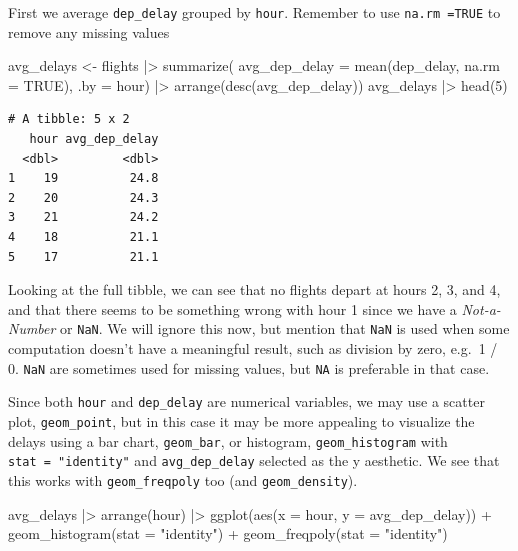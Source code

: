 \documentclass[
  letterpaper,
  DIV=11,
  numbers=noendperiod]{scrreprt}
\newenvironment{Shaded}{\begin{snugshade}}{\end{snugshade}}
\newcommand{\AttributeTok}[1]{\textcolor[rgb]{0.40,0.45,0.13}{#1}}
\newcommand{\ConstantTok}[1]{\textcolor[rgb]{0.56,0.35,0.01}{#1}}
\newcommand{\DecValTok}[1]{\textcolor[rgb]{0.68,0.00,0.00}{#1}}
\newcommand{\FunctionTok}[1]{\textcolor[rgb]{0.28,0.35,0.67}{#1}}
\newcommand{\NormalTok}[1]{\textcolor[rgb]{0.00,0.23,0.31}{#1}}
\newcommand{\OtherTok}[1]{\textcolor[rgb]{0.00,0.23,0.31}{#1}}
\newcommand{\SpecialCharTok}[1]{\textcolor[rgb]{0.37,0.37,0.37}{#1}}
\newcommand{\StringTok}[1]{\textcolor[rgb]{0.13,0.47,0.30}{#1}}
\begin{document}
First we average \texttt{dep\_delay} grouped by \texttt{hour}. Remember
to use \texttt{na.rm\ =TRUE} to remove any missing values

\begin{Shaded}
\begin{Highlighting}[]
\NormalTok{avg\_delays }\OtherTok{\textless{}{-}}\NormalTok{ flights }\SpecialCharTok{|\textgreater{}}
  \FunctionTok{summarize}\NormalTok{(}
    \AttributeTok{avg\_dep\_delay =} \FunctionTok{mean}\NormalTok{(dep\_delay, }\AttributeTok{na.rm =} \ConstantTok{TRUE}\NormalTok{), }
    \AttributeTok{.by =}\NormalTok{ hour) }\SpecialCharTok{|\textgreater{}}
  \FunctionTok{arrange}\NormalTok{(}\FunctionTok{desc}\NormalTok{(avg\_dep\_delay))}
\NormalTok{avg\_delays }\SpecialCharTok{|\textgreater{}} \FunctionTok{head}\NormalTok{(}\DecValTok{5}\NormalTok{)}
\end{Highlighting}
\end{Shaded}

\begin{verbatim}
# A tibble: 5 x 2
   hour avg_dep_delay
  <dbl>         <dbl>
1    19          24.8
2    20          24.3
3    21          24.2
4    18          21.1
5    17          21.1
\end{verbatim}

Looking at the full tibble, we can see that no flights depart at hours
2, 3, and 4, and that there seems to be something wrong with hour 1
since we have a \emph{Not-a-Number} or \texttt{NaN}. We will ignore this
now, but mention that \texttt{NaN} is used when some computation doesn't
have a meaningful result, such as division by zero, e.g.~1 / 0.
\texttt{NaN} are sometimes used for missing values, but \texttt{NA} is
preferable in that case.

Since both \texttt{hour} and \texttt{dep\_delay} are numerical
variables, we may use a scatter plot, \texttt{geom\_point}, but in this
case it may be more appealing to visualize the delays using a bar chart,
\texttt{geom\_bar}, or histogram, \texttt{geom\_histogram} with
\texttt{stat\ =\ "identity"} and \texttt{avg\_dep\_delay} selected as
the y aesthetic. We see that this works with \texttt{geom\_freqpoly} too
(and \texttt{geom\_density}).

\begin{Shaded}
\begin{Highlighting}[]
\NormalTok{avg\_delays }\SpecialCharTok{|\textgreater{}}
  \FunctionTok{arrange}\NormalTok{(hour) }\SpecialCharTok{|\textgreater{}}
  \FunctionTok{ggplot}\NormalTok{(}\FunctionTok{aes}\NormalTok{(}\AttributeTok{x =}\NormalTok{ hour, }\AttributeTok{y =}\NormalTok{ avg\_dep\_delay)) }\SpecialCharTok{+} 
  \FunctionTok{geom\_histogram}\NormalTok{(}\AttributeTok{stat =} \StringTok{"identity"}\NormalTok{) }\SpecialCharTok{+} 
  \FunctionTok{geom\_freqpoly}\NormalTok{(}\AttributeTok{stat =} \StringTok{"identity"}\NormalTok{)}
\end{Highlighting}
\end{Shaded}
\end{document}

